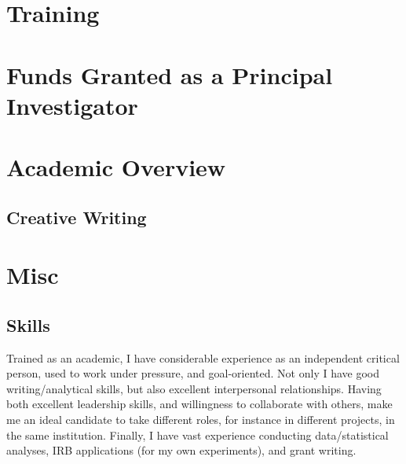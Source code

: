 \documentclass[letterpaper]{article}
\begin{document}
\section*{Training}

{\unskip}



\section*{Funds Granted as a Principal Investigator}
{\unskip}


\section*{Academic Overview}
{\unskip}

\subsection*{Creative Writing}
{\unskip}


\section*{Misc}

\subsection*{Skills}
Trained as an academic, I have considerable experience as an independent critical person, used to work under pressure, and goal-oriented. Not only I have good writing/analytical skills, but also excellent interpersonal relationships. Having both excellent leadership skills, and willingness to collaborate with others, make me an ideal candidate to take different roles, for instance in different projects, in the same institution. Finally, I have vast experience conducting data/statistical analyses, IRB applications (for my own experiments), and grant writing.


{\unskip}




\bigskip
\end{document}
